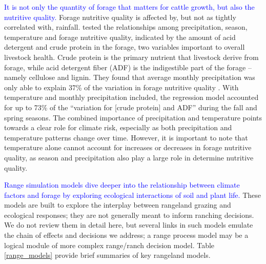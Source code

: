 \documentclass[11pt]{article}
\begin{document}
\textcolor{blue}{It is not only the quantity of forage that matters for cattle growth, but also the nutritive quality.} Forage nutritive quality is affected by, but not as tightly correlated with, rainfall. \citet{McCuistion2014a} tested the relationships among precipitation, season, temperature and forage nutritive quality, indicated by the amount of acid detergent and crude protein in the forage, two variables important to overall livestock health. Crude protein is the primary nutrient that livestock derive from forage, while acid detergent fiber (ADF) is the indigestible part of the forage – namely cellulose and lignin. They found that average monthly precipitation was only able to explain 37\% of the variation in forage nutritive quality \citep{McCuistion2014a}. With temperature and monthly precipitation included, the regression model accounted for up to 73\% of the ``variation for [crude protein] and ADF'' during the fall and spring seasons. The combined importance of precipitation and temperature points towards a clear role for climate risk, especially as both precipitation and temperature patterns change over time. However, it is important to note that temperature alone cannot account for increases or decreases in forage nutritive quality, as season and precipitation also play a large role in determine nutritive quality. 

\textcolor{blue}{Range simulation models dive deeper into the relationship between climate factors and forage by exploring ecological interactions of soil and plant life.} These models are built to explore the interplay between rangeland grazing and ecological responses; they are not generally meant to inform ranching decisions. We do not review them in detail here, but several links in such models emulate the chain of effects and decisions we address; a range process model may be a logical module of more complex range/ranch decision model. Table \ref{range_models} provide brief summaries of key rangeland models. %
\end{document}
